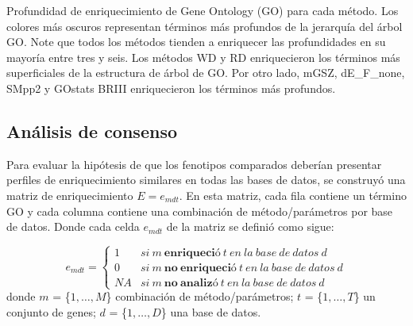 \documentclass[12pt,twoside]{reedthesis}
\begin{document}
Profundidad de enriquecimiento de Gene Ontology (GO) para cada método. Los colores más oscuros representan términos más profundos de la jerarquía del árbol GO. Note que todos los métodos tienden a enriquecer las profundidades en su mayoría entre tres y seis. Los métodos WD y RD enriquecieron los términos más superficiales de la estructura de árbol de GO. Por otro lado, mGSZ, dE\_F\_none, SMpp2 y GOstats BRIII enriquecieron los términos más profundos.



\hypertarget{sec:consensusSection}{%
\subsection{Análisis de consenso}\label{sec:consensusSection}}

\par

Para evaluar la hipótesis de que los fenotipos comparados deberían presentar perfiles de enriquecimiento similares en todas las bases de datos, se construyó una matriz de enriquecimiento \(E=e_{mdt}\). En esta matriz, cada fila contiene un término GO y cada columna contiene una combinación de método/parámetros por base de datos. Donde cada celda \(e_{mdt}\) de la matriz se definió como sigue:

\[
e_{mdt}=\left\{\begin{matrix}
1 & si\:m\:\mathbf{enriqueció}\:t\:en\:la\:base\:de\:datos\:d \\
0 & si\:m\:\mathbf{no\:enriqueció}\:t\:en\:la\:base\:de\:datos\:d \\
NA & si\:m\:\mathbf{no\:analizó}\:t\:en\:la\:base\:de\:datos\:d
\end{matrix}\right.
\]
donde \(m\) = \{\(1,\ldots,M\)\} combinación de método/parámetros; \(t\) = \{\(1,\ldots,T\)\} un conjunto de genes; \(d\) = \{\(1,\ldots,D\)\} una base de datos.

\par
\end{document}
